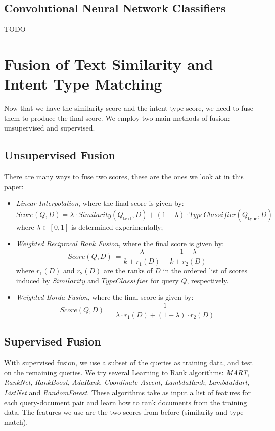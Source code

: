 \subsection{Convolutional Neural Network Classifiers}
TODO

\section{Fusion of Text Similarity and Intent Type Matching}
Now that we have the similarity score and the intent type score, we need to fuse them to produce the final score.
We employ two main methods of fusion: unsupervised and supervised.

\subsection{Unsupervised Fusion}
There are many ways to fuse two scores, these are the ones we look at in this paper:

\begin{itemize}
 \item \emph{Linear Interpolation}, where the final score is given by: 
 \begin{equation} \label{interp-formula}
 Score(Q, D) = \lambda \cdot Similarity(Q_{\text{text}}, D) + (1-\lambda) \cdot TypeClassifier(Q_{\text{type}}, D)
 \end{equation}
where $\lambda\in [0,1]$ is determined experimentally;

\item \emph{Weighted Reciprocal Rank Fusion}, where the final score is given by:
 \begin{equation}\label{rrf-formula}
  Score(Q,D)\ =  \displaystyle\frac{\lambda}{k + r_1(D)} + \displaystyle\frac{1- \lambda}{k + r_2(D)}
 \end{equation}
  where $r_1(D)$ and $r_2(D)$ are the ranks of $D$ in the ordered list of scores induced by $Similarity$ and $TypeClassifier$ for query $Q$, respectively.
 
 \item \emph{Weighted Borda Fusion},  where the final score is given by:
 \begin{equation}\label{borda-formula}
    Score(Q,D)\ =  \displaystyle\frac{1}{\lambda \cdot r_1(D) + (1-\lambda)\cdot r_2(D)}
 \end{equation}
  
  \end{itemize}

\subsection{Supervised Fusion}
With supervised fusion, we use a subset of the queries as training data, and test on the remaining queries.
We try several Learning to Rank algorithms: \emph{MART}, \emph{RankNet}, \emph{RankBoost}, \emph{AdaRank},
\emph{Coordinate Ascent}, \emph{LambdaRank}, \emph{LambdaMart}, \emph{ListNet} and \emph{RandomForest}.
These algorithms take as input a list of features for each query-document pair and learn how to rank documents from the training
data.
The features we use are the two scores from before (similarity and type-match).


